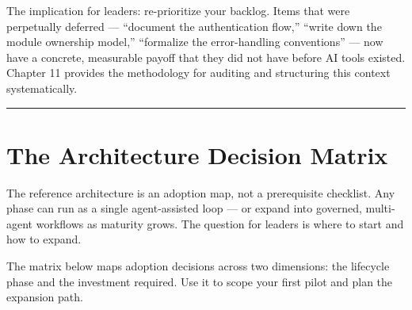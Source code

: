 \documentclass[
  a4paper,
  DIV=11,
  numbers=noendperiod]{scrreprt}
\begin{document}
The implication for leaders: re-prioritize your backlog. Items that were
perpetually deferred --- ``document the authentication flow,'' ``write
down the module ownership model,'' ``formalize the error-handling
conventions'' --- now have a concrete, measurable payoff that they did
not have before AI tools existed. Chapter 11 provides the methodology
for auditing and structuring this context systematically.

\begin{center}\rule{0.5\linewidth}{0.5pt}\end{center}

\section{The Architecture Decision
Matrix}\label{the-architecture-decision-matrix}

The reference architecture is an adoption map, not a prerequisite
checklist. Any phase can run as a single agent-assisted loop --- or
expand into governed, multi-agent workflows as maturity grows. The
question for leaders is where to start and how to expand.

The matrix below maps adoption decisions across two dimensions: the
lifecycle phase and the investment required. Use it to scope your first
pilot and plan the expansion path.
\end{document}
